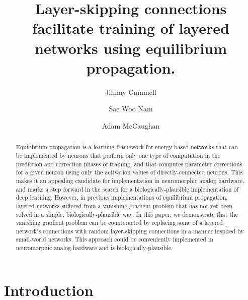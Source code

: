 \documentclass[format=sigconf]{acmart}
\title{Layer-skipping connections facilitate training of layered networks using equilibrium propagation.}
\author{Jimmy Gammell}
\author{Sae Woo Nam}
\author{Adam McCaughan}
\begin{document}
\begin{abstract}

Equilibrium propagation is a learning framework for energy-based networks that can be implemented by neurons that perform only one type of computation in the prediction and correction phases of training, and that computes parameter corrections for a given neuron using only the activation values of directly-connected neurons. This makes it an appealing candidate for implementation in neuromorphic analog hardware, and marks a step forward in the search for a biologically-plausible implementation of deep learning. However, in previous implementations of equilibrium propagation, layered networks suffered from a vanishing gradient problem that has not yet been solved in a simple, biologically-plausible way. In this paper, we demonstrate that the vanishing gradient problem can be counteracted by replacing some of a layered network's connections with random layer-skipping connections in a manner inspired by small-world networks. This approach could be conveniently implemented in neuromorphic analog hardware and is biologically-plausible.

\end{abstract}

\maketitle

\section{Introduction}
\end{document}
